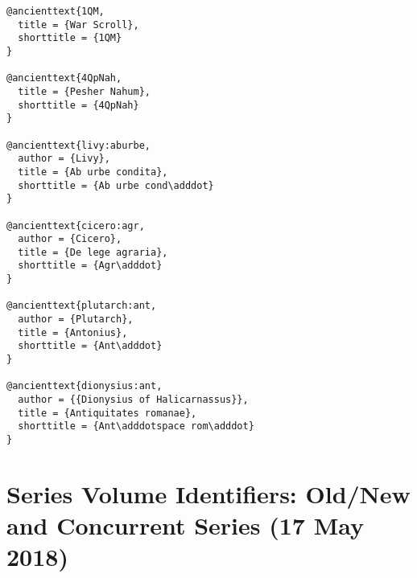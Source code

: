 \documentclass[a4paper]{article}
\begin{document}
\begin{verbatim}
@ancienttext{1QM,
  title = {War Scroll},
  shorttitle = {1QM}
}

@ancienttext{4QpNah,
  title = {Pesher Nahum},
  shorttitle = {4QpNah}
}

@ancienttext{livy:aburbe,
  author = {Livy},
  title = {Ab urbe condita},
  shorttitle = {Ab urbe cond\adddot}
}

@ancienttext{cicero:agr,
  author = {Cicero},
  title = {De lege agraria},
  shorttitle = {Agr\adddot}
}

@ancienttext{plutarch:ant,
  author = {Plutarch},
  title = {Antonius},
  shorttitle = {Ant\adddot}
}

@ancienttext{dionysius:ant,
  author = {{Dionysius of Halicarnassus}},
  title = {Antiquitates romanae},
  shorttitle = {Ant\adddotspace rom\adddot}
}
\end{verbatim}

\begin{verbcite}
  \nocite{AB, ABD, philo:abr, philo:agr, tacitus:ann, graniuslicinianus:ann,
    AJSL, atlantis, AzTh, BibIntSeries, BibInt, BSac, JSOTSup,
    justinmartyr:1apol, 1en, 1QM, 4QpNah, livy:aburbe, cicero:agr,
    plutarch:ant, dionysius:ant}
\end{verbcite}
\exampleancientsources
\examplesecondarysources
{}

\section{Series Volume Identifiers: Old/New and Concurrent Series (17 May 2018)}
\end{document}
